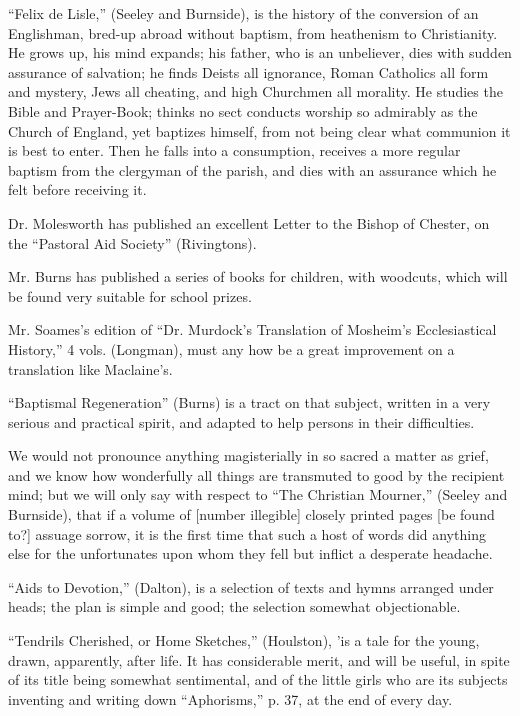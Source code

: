 ``Felix de Lisle,'' (Seeley and Burnside), is the
history of the conversion of an Englishman, bred-up abroad without
baptism, from heathenism to Christianity. He grows up, his mind expands;
his father, who is an unbeliever, dies with sudden assurance of
salvation; he finds Deists all ignorance, Roman Catholics all form and
mystery, Jews all cheating, and high Churchmen all morality. He studies
the Bible and Prayer-Book; thinks no sect conducts worship so admirably
as the Church of England, yet baptizes himself, from not being clear
what communion it is best to enter. Then he falls into a consumption,
receives a more regular baptism from the clergyman of the parish,
and dies with an assurance which he felt before receiving it.

Dr. Molesworth has published an excellent Letter to
the Bishop of Chester, on the ``Pastoral Aid Society'' (Rivingtons).

Mr. Burns has published a series of books for
children, with woodcuts, which will be found very suitable for school
prizes.

Mr. Soames's edition of ``Dr. Murdock's Translation
of Mosheim's Ecclesiastical History,'' 4 vols. (Longman), must any how be
a great improvement on a translation like Maclaine's.

``Baptismal Regeneration'' (Burns) is a tract on that
subject, written in a very serious and practical spirit, and adapted to
help persons in their difficulties.

We would not pronounce anything magisterially in so
sacred a matter as grief, and we know how wonderfully all things are
transmuted to good by the recipient mind; but we will only say with
respect to ``The Christian Mourner,'' (Seeley and Burnside), that if a
volume of [number illegible] closely printed pages [be found to?]
assuage sorrow, it is the first time that such a host of words did
anything else for the unfortunates upon whom they fell but inflict a
desperate headache.

``Aids to Devotion,'' (Dalton), is a selection of
texts and hymns arranged under heads; the plan is simple and good; the
selection somewhat objectionable.

``Tendrils Cherished, or Home Sketches,'' (Houlston),
'is a tale for the young, drawn, apparently, after life. It has
considerable merit, and will be useful, in spite of its title being
somewhat sentimental, and of the little girls who are its subjects
inventing and writing down ``Aphorisms,'' p. 37, at the end of every day.

